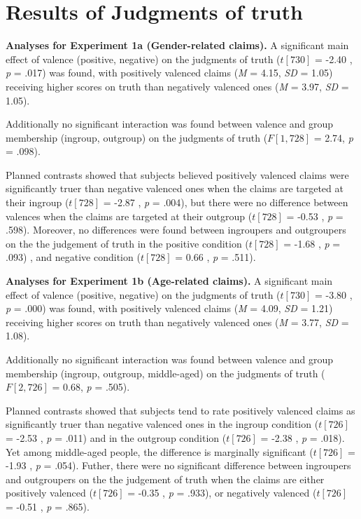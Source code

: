 \documentclass[man]{apa6}
\begin{document}
\section{Results of Judgments of
truth}\label{results-of-judgments-of-truth}

\textbf{Analyses for Experiment 1a (Gender-related claims).} A
significant main effect of valence (positive, negative) on the judgments
of truth (\(t [730]\) = -2.40 , \emph{p} = .017) was found, with
positively valenced claims (\emph{M} = 4.15, \emph{SD} = 1.05) receiving
higher scores on truth than negatively valenced ones (\emph{M} = 3.97,
\emph{SD} = 1.05).

Additionally no significant interaction was found between valence and
group membership (ingroup, outgroup) on the judgments of truth
(\(F [1, 728]\) = 2.74, \emph{p} = .098).

Planned contrasts showed that subjects believed positively valenced
claims were significantly truer than negative valenced ones when the
claims are targeted at their ingroup (\(t [728]\) = -2.87 , \emph{p} =
.004), but there were no difference between valences when the claims are
targeted at their outgroup (\(t [728]\) = -0.53 , \emph{p} = .598).
Moreover, no differences were found between ingroupers and outgroupers
on the the judgement of truth in the positive condition (\(t [728]\) =
-1.68 , \emph{p} = .093) , and negative condition (\(t [728]\) = 0.66 ,
\emph{p} = .511).

\textbf{Analyses for Experiment 1b (Age-related claims).} A significant
main effect of valence (positive, negative) on the judgments of truth
(\(t [730]\) = -3.80 , \emph{p} = .000) was found, with positively
valenced claims (\emph{M} = 4.09, \emph{SD} = 1.21) receiving higher
scores on truth than negatively valenced ones (\emph{M} = 3.77,
\emph{SD} = 1.08).

Additionally no significant interaction was found between valence and
group membership (ingroup, outgroup, middle-aged) on the judgments of
truth (\(F [2, 726]\) = 0.68, \emph{p} = .505).

Planned contrasts showed that subjects tend to rate positively valenced
claims as significantly truer than negative valenced ones in the ingroup
condition (\(t [726]\) = -2.53 , \emph{p} = .011) and in the outgroup
condition (\(t [726]\) = -2.38 , \emph{p} = .018). Yet among middle-aged
people, the difference is marginally significant (\(t [726]\) = -1.93 ,
\emph{p} = .054). Futher, there were no significant difference between
ingroupers and outgroupers on the the judgement of truth when the claims
are either positively valenced (\(t [726]\) = -0.35 , \emph{p} = .933),
or negatively valenced (\(t [726]\) = -0.51 , \emph{p} = .865).
\end{document}
